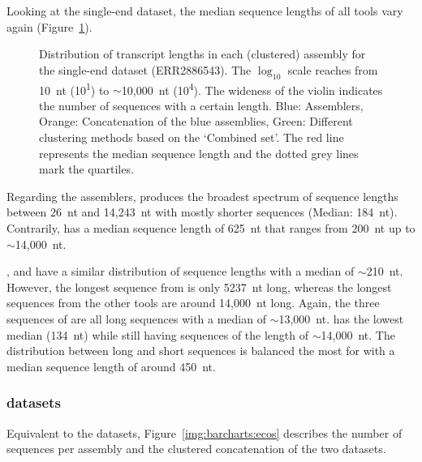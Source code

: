 \documentclass[12pt,a4paper,english]{article}
\begin{document}
    Looking at the single-end dataset, the median sequence lengths of all tools vary again (Figure~\ref{img:violin:cel_ERR2886543}).
    \begin{figure}[H]
    	\centering
    	\def\svgwidth{\textwidth}
    	
    	\caption[Distribution of transcript lengths per assembly (SE, ERR2886543)]{Distribution of transcript lengths in each (clustered) assembly for the single-end \celegans dataset (ERR2886543). The $\log_{10}$ scale reaches from 10~nt (10\textsuperscript{1}) to $\sim$10,000~nt (10\textsuperscript{4}). The wideness of the violin indicates the number of sequences with a certain length. Blue: Assemblers, Orange: Concatenation of the blue assemblies, Green: Different clustering methods based on the `Combined set'. The red line represents the median sequence length and the dotted grey lines mark the quartiles.}
    	\label{img:violin:cel_ERR2886543}
    \end{figure}
	Regarding the assemblers, \soap produces the broadest spectrum of sequence lengths between 26~nt and 14,243~nt with mostly shorter sequences (Median: 184~nt). Contrarily, \trinity has a median sequence length of 625~nt that ranges from 200~nt up to $\sim$14,000~nt.
	
	\cdhit, \linclust and \mclust have a similar distribution of sequence lengths with a median of $\sim$210~nt. However, the longest sequence from \mclust is only 5237~nt long, whereas the longest sequences from the other tools are around 14,000~nt long.
	Again, the three sequences of \grouper are all long sequences with a median of $\sim$13,000~nt.
	\mclusttwo has the lowest median (134~nt) while still having sequences of the length of $\sim$14,000~nt.
	The distribution between long and short sequences is balanced the most for \karma with a median sequence length of around 450~nt.



\subsubsection*{\ecoli datasets}

    Equivalent to the \celegans datasets, Figure~\ref{img:barcharts:ecos} describes the number of sequences per assembly and the clustered concatenation of the two \ecoli datasets.
\end{document}
